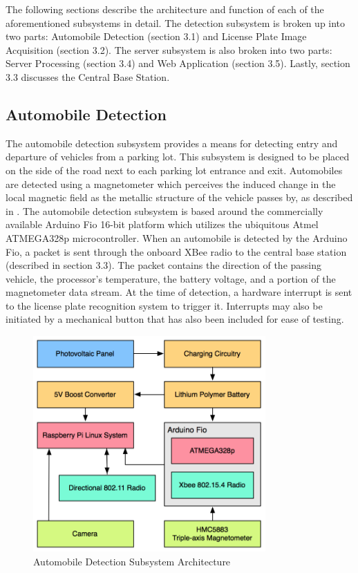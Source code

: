 \documentclass[11pt, oneside, fullpage, doublespace]{article}
\begin{document}
The following sections describe the architecture and function of each of the aforementioned subsystems in detail. The detection subsystem is broken up into two parts: Automobile Detection (section 3.1) and License Plate Image Acquisition (section 3.2). The server subsystem is also broken into two parts: Server Processing (section 3.4) and Web Application (section 3.5). Lastly, section 3.3 discusses the Central Base Station.

\subsection{Automobile Detection}
The automobile detection subsystem provides a means for detecting entry and departure of vehicles from a parking lot. This subsystem is designed to be placed on the side of the road next to each parking lot entrance and exit. Automobiles are detected using a magnetometer which perceives the induced change in the local magnetic field as the metallic structure of the vehicle passes by, as described in \cite{stillwell2013}. The automobile detection subsystem is based around the commercially available Arduino Fio 16-bit platform which utilizes the ubiquitous Atmel ATMEGA328p microcontroller. When an automobile is detected by the Arduino Fio, a packet is sent through the onboard XBee radio to the central base station (described in section 3.3). The packet  contains the direction of the passing vehicle, the processor's temperature, the battery voltage, and a portion of the magnetometer data stream. At the time of detection, a hardware interrupt is sent to the license plate recognition system to trigger it. Interrupts may also be initiated by a mechanical button that has also been included for ease of testing.

\begin{figure}
\begin{center}
\includegraphics[width=3.5in]{autodetection}
\end{center}
\caption{Automobile Detection Subsystem Architecture}
\label{fig:autodetect}
\end{figure}
\end{document}
